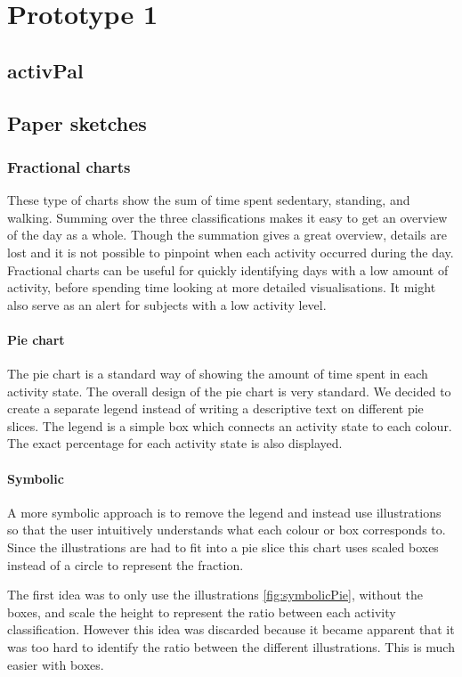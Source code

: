 \chapter{Prototype 1}

\section{activPal}

\section{Paper sketches}

\subsection{Fractional charts}
These type of charts show the sum of time spent sedentary, standing, and walking. Summing over the three classifications makes it easy to get an overview of the day as a whole. Though the summation gives a great overview, details are lost and it is not possible to pinpoint when each activity occurred during the day. Fractional charts can be useful for quickly identifying days with a low amount of activity, before spending time looking at more detailed visualisations. It might also serve as an alert for subjects with a low activity level.

\subsubsection{Pie chart}
The pie chart is a standard way of showing the amount of time spent in each activity state. The overall design of the pie chart is very standard. We decided to create a separate legend instead of writing a descriptive text on different pie slices. The legend is a simple box which connects an activity state to each colour. The exact percentage for each activity state is also displayed.

\subsubsection{Symbolic}
A more symbolic approach is to remove the legend and instead use illustrations so that the user intuitively understands what each colour or box corresponds to. Since the illustrations are had to fit into a pie slice this chart uses scaled boxes instead of a circle to represent the fraction. 

The first idea was to only use the illustrations \ref{fig:symbolicPie}, without the boxes, and scale the height to represent the ratio between each activity classification. However this idea was discarded because it became apparent that it was too hard to identify the ratio between the different illustrations. This is much easier with boxes.

